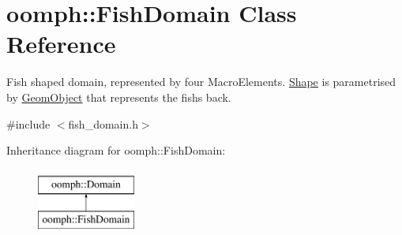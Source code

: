 \hypertarget{classoomph_1_1FishDomain}{}\section{oomph\+:\+:Fish\+Domain Class Reference}
\label{classoomph_1_1FishDomain}


Fish shaped domain, represented by four Macro\+Elements. \hyperlink{classoomph_1_1Shape}{Shape} is parametrised by \hyperlink{classoomph_1_1GeomObject}{Geom\+Object} that represents the fish\textquotesingle{}s back.  




{\ttfamily \#include $<$fish\+\_\+domain.\+h$>$}

Inheritance diagram for oomph\+:\+:Fish\+Domain\+:\begin{figure}[H]
\begin{center}
\leavevmode
\includegraphics[height=2.000000cm]{classoomph_1_1FishDomain}
\end{center}
\end{figure}

